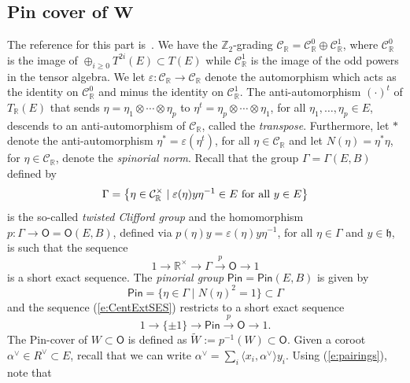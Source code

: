 \documentclass[pdftex]{sigma}
\numberwithin{equation}{section}
\newcommand{\fh}{\mathfrak{h}}
\newcommand{\bbr}{\mathbb{R}}
\newcommand{\lpi}{\langle}
\newcommand{\rpi}{\rangle}
\begin{document}
\subsection[Pin cover of W]{Pin cover of $\boldsymbol{W}$} \label{s:PinCover}
The reference for this part is~\cite{M76}. We have the $\mathbb{Z}_2$-grading $\mathcal{C}_\bbr = \mathcal{C}_\bbr^0\oplus\mathcal{C}_\bbr^1$, where $\mathcal{C}_\bbr^0$ is the image of $\oplus_{i\geq 0} T^{2i}(E)\subset T(E)$ while $\mathcal{C}_\bbr^1$ is the image of the odd powers in the tensor algebra. We let $\varepsilon\colon \mathcal{C}_\bbr\to\mathcal{C}_\bbr$ denote the automorphism which acts as the identity on $\mathcal{C}_\bbr^0$ and minus the identity on $\mathcal{C}_\bbr^1$. The anti-automorphism ${(\cdot)}^t$ of $T_\bbr(E)$ that sends $\eta = \eta_1\otimes\cdots\otimes\eta_p$ to $\eta^t = \eta_p\otimes\cdots\otimes\eta_1$, for all $\eta_1,\dots,\eta_p\in E$, descends to an anti-automorphism of $\mathcal{C}_\bbr$, called the {\it transpose}. Furthermore, let $\ast$ denote the anti-automorphism $\eta^* = \varepsilon(\eta^t)$, for all $\eta\in\mathcal{C}_\bbr$ and let $N(\eta) = \eta^*\eta$, for $\eta \in \mathcal{C}_\bbr$, denote the {\it spinorial norm}. Recall that the group $\Gamma = \Gamma(E,B)$ defined by
\[
\Gamma = \big\{\eta\in\mathcal{C}_\bbr^\times\mid \varepsilon(\eta)y\eta^{-1}\in E \textup{ for all } y\in E\big\}
\]
is the so-called {\it twisted Clifford group} and the homomorphism $p\colon \Gamma\to \mathsf{O}=\mathsf{O}(E,B)$, defined via $p(\eta)y = \varepsilon(\eta)y\eta^{-1}$, for all $\eta\in\Gamma$ and $y\in\fh$, is such that the sequence
\begin{equation}\label{e:CentExtSES}
1 \longrightarrow \bbr^\times \longrightarrow \Gamma \stackrel{p}{\longrightarrow} \mathsf{O} \longrightarrow 1
\end{equation}
is a short exact sequence. The {\it pinorial group} $\mathsf{Pin} = \mathsf{Pin}(E,B)$ is given by
\[
\mathsf{Pin} = \big\{\eta\in\Gamma \mid N(\eta)^2 = 1 \big\} \subset \Gamma
\]
and the sequence (\ref{e:CentExtSES}) restricts to a short exact sequence
\begin{equation}\label{e:WSES}
1 \longrightarrow \{\pm 1\} \longrightarrow \mathsf{Pin} \stackrel{p}{\longrightarrow} \mathsf{O} \longrightarrow 1.
\end{equation}
The Pin-cover of $W\subset\mathsf{O}$ is defined as $\tilde W := p^{-1}(W)\subset \mathsf{O}$. Given a coroot $\alpha^\vee\in R^\vee\subset E$, recall that we can write $\alpha^\vee = \sum_i\lpi x_i,\alpha^\vee \rpi y_i$. Using (\ref{e:pairings}), note that
\end{document}
